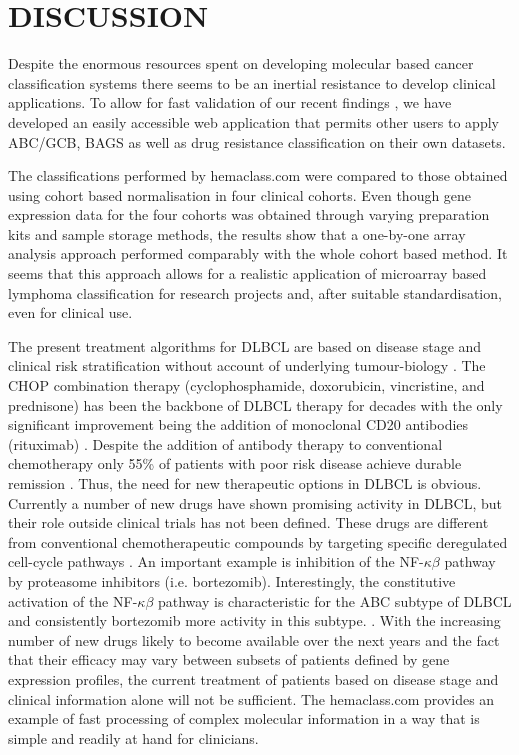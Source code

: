 \documentclass[10pt]{bmc_article}
\newenvironment{bmcformat}{\fussy\setboolean{publ}{true}}{\fussy}
\begin{document}
\begin{bmcformat}
\section*{DISCUSSION}
Despite the enormous resources spent on developing molecular based cancer classification systems there seems to be an inertial resistance to develop clinical applications. To allow for fast validation of our recent findings \cite{Dybkaer2013, Falgreen2013c}, we have developed an easily accessible web application that permits other users to apply ABC/GCB, BAGS as well as drug resistance classification on their own datasets.

The classifications performed by hemaclass.com were compared to those obtained using cohort based normalisation in four clinical cohorts.  Even though gene expression data for the four cohorts was obtained through varying preparation kits and sample storage methods, the results show that a one-by-one array analysis approach performed comparably with the whole cohort based method. It seems that this approach allows for a realistic application of microarray based lymphoma classification for research projects and, after suitable standardisation, even for clinical use.

The present treatment algorithms for DLBCL are based on disease stage and clinical risk stratification without account of underlying tumour-biology \cite{Schmoll2012}. The CHOP combination therapy (cyclophosphamide, doxorubicin, vincristine, and prednisone) has been the backbone of DLBCL therapy for decades with the only significant improvement being the addition of monoclonal CD20 antibodies (rituximab) \cite{Coiffier2002a}. Despite the addition of antibody therapy to conventional chemotherapy only 55\% of patients with poor risk disease achieve durable remission \cite{Ziepert2010}. Thus, the need for new therapeutic options in DLBCL is obvious. Currently a number of new drugs have shown promising activity in DLBCL, but their role outside clinical trials has not been defined. These drugs are different from conventional chemotherapeutic compounds by targeting specific deregulated cell-cycle pathways \cite{Friedberg2011}. An important example is inhibition of the NF-$\kappa\beta$ pathway by proteasome inhibitors (i.e. bortezomib). Interestingly, the constitutive activation of the NF-$\kappa\beta$ pathway is characteristic for the ABC subtype of DLBCL and consistently bortezomib more activity in this subtype. \cite{Nogai2013}. With the increasing number of new drugs likely to become available over the next years and the fact that their efficacy may vary between subsets of patients defined by gene expression profiles, the current treatment of patients based on disease stage and clinical information alone will not be sufficient. The hemaclass.com provides an example of fast processing of complex molecular information in a way that is simple and readily at hand for clinicians.


\end{bmcformat}
\end{document}
